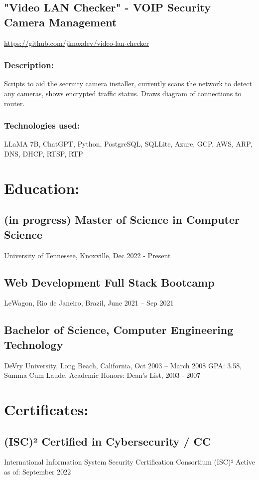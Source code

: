 \documentclass[letter,10pt]{article}
\begin{document}
\subsection*{"Video LAN Checker" - VOIP Security Camera Management}
\label{sec:org1ed880f}
\url{https://github.com/jknoxdev/video-lan-checker}
\subsubsection*{Description:}
\label{sec:org0598e9c}
Scripts to aid the secruity camera installer, currently scans the network to detect any cameras, shows encrypted traffic status. Draws diagram of connections to router.
\subsubsection*{Technologies used:}
\label{sec:orgce0d85f}
LLaMA 7B, ChatGPT, Python, PostgreSQL, SQLLite, Azure, GCP, AWS, ARP, DNS, DHCP, RTSP, RTP

\section*{Education:}
\label{sec:org7840ca9}
\subsection*{(in progress) Master of Science in Computer Science}
\label{sec:org96c5cc8}
University of Tennessee, Knoxville, Dec 2022 - Present
\subsection*{Web Development Full Stack Bootcamp}
\label{sec:org0a4aa88}
LeWagon, Rio de Janeiro, Brazil, June 2021 – Sep 2021
\subsection*{Bachelor of Science, Computer Engineering Technology}
\label{sec:orgfd01527}
DeVry University, Long Beach, California, Oct 2003 – March 2008
GPA: 3.58, Summa Cum Laude, Academic Honors: Dean’s List, 2003 - 2007

\section*{Certificates:}
\label{sec:org62f6631}
\subsection*{(ISC)² Certified in Cybersecurity / CC}
\label{sec:orgb4027ad}
International Information System Security Certification Consortium (ISC)²
Active as of: September 2022
\end{document}
